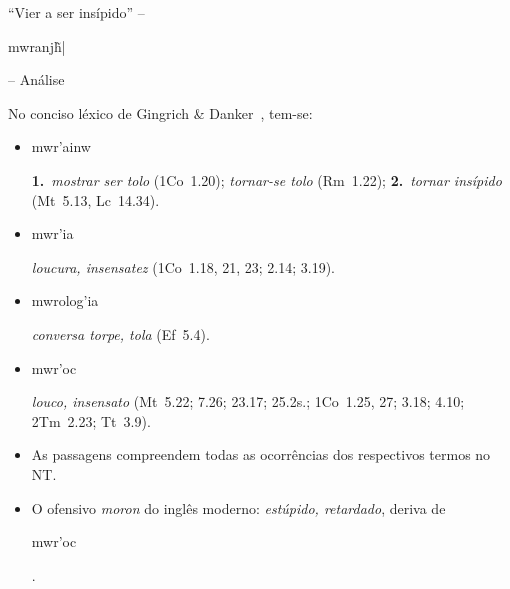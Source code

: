 \documentclass[12pt,aspectratio=169]{beamer}
\newcommand{\YEL}[1]{{\textcolor{TXyel}{#1}}}
\newcommand{\CYA}[1]{{\textcolor{TXcya}{#1}}}
\newcommand{\BRI}[1]{{\textcolor{BSpbg}{#1}}}   %
\newcommand{\GRtxt}[1]{\begin{otherlanguage}{greek}{{#1}}\end{otherlanguage}}
\begin{document}
    \begin{frame}{\BRI{``Vier a ser insípido''} -- \BRI{\GRtxt{mwranj\~h|}} -- \BRI{Análise}}
        No conciso léxico de Gingrich \& Danker~\cite{2007-GingrichFW-VidaNova}, tem-se:
        \\[\medskipamount]
        \begin{itemize}
            \item<1-> \YEL{\GRtxt{mwr'ainw}} \BRI{\bf 1.}~\CYA{\textit{mostrar ser tolo}} (1Co~1.20);
                \CYA{\textit{tornar-se tolo}} (Rm~1.22); \BRI{\bf 2.}~\CYA{\textit{tornar
                insípido}} (Mt~5.13, Lc~14.34).
                \\[\medskipamount]
            \item<2-> \YEL{\GRtxt{mwr'ia}} \CYA{\textit{loucura, insensatez}} (1Co~1.18, 21, 23;
                2.14; 3.19).
                \\[\medskipamount]
            \item<3-> \YEL{\GRtxt{mwrolog'ia}} \CYA{\textit{conversa torpe, tola}} (Ef~5.4).
                \\[\medskipamount]
            \item<4-> \YEL{\GRtxt{mwr'oc}} \CYA{\textit{louco, insensato}} (Mt~5.22; 7.26;
                23.17; 25.2s.; 1Co~1.25, 27; 3.18; 4.10; 2Tm~2.23; Tt~3.9).
                \\[\medskipamount]
            \item<5-> As passagens compreendem \BRI{todas} as ocorrências dos respectivos termos
                no NT.
                \\[\medskipamount]
            \item<6-> O ofensivo \CYA{\textit{moron}} do inglês moderno: \CYA{\textit{estúpido,
                retardado}}, deriva de \YEL{\GRtxt{mwr'oc}}.
        \end{itemize}
    \end{frame}
\end{document}
